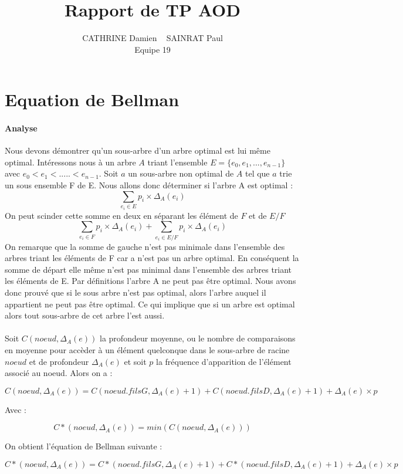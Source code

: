 \documentclass[a4paper, 10pt, french]{article}
\title{ \bf Rapport de TP AOD}
\author{
CATHRINE Damien ~ SAINRAT Paul
\\ Equipe 19
}
\begin{document}
\maketitle

\section{Equation de Bellman}
\paragraph{Analyse} Nous devons démontrer qu'un sous-arbre d'un arbre optimal est lui même optimal. Intéressons nous à un arbre $A$ triant l'ensemble $E = \{e_0,e_1,...,e_{n-1}\}$ avec $e_0<e_1<.....<e_{n-1}$. Soit $a$ un sous-arbre non optimal de $A$ tel que $a$ trie un sous ensemble F de E. Nous allons donc déterminer si l'arbre A est optimal :
\[\sum_{e_i\in E} p_i \times \Delta_{A}(e_i) \]
On peut scinder cette somme en deux en séparant les élément de $F$ et de $E/F$
\[\sum_{e_i\in F} p_i \times \Delta_{A}(e_i) + \sum_{e_i\in E/F} p_i \times \Delta_{A}(e_i) \]
On remarque que la somme de gauche n'est pas minimale dans l'ensemble des arbres triant les éléments de F car a n'est pas un arbre optimal. En conséquent la somme de départ elle même n'est pas minimal dans l'ensemble des arbres triant les éléments de E. Par définitions l'arbre A ne peut pas être optimal. Nous avons donc prouvé que si le sous arbre n'est pas optimal, alors l'arbre auquel il appartient ne peut pas être optimal. Ce qui implique que si un arbre est optimal alors tout sous-arbre de cet arbre l'est aussi.
\\
\\
Soit $C(noeud, \Delta_{A}(e))$ la profondeur moyenne, ou le nombre de comparaisons en moyenne pour accèder à un élément quelconque dans le sous-arbre de racine $noeud$ et de profondeur $\Delta_{A}(e)$ et soit $p$ la fréquence d'apparition de l'élément associé au noeud. Alors on a :

\[  C(noeud, \Delta_{A}(e)) = C(noeud.filsG, \Delta_{A}(e) + 1) + C(noeud.filsD, \Delta_{A}(e) + 1) + \Delta_{A}(e) \times p \]

Avec :

\[  C*(noeud, \Delta_{A}(e)) = min(C(noeud, \Delta_{A}(e))) \]

On obtient l'équation de Bellman suivante :

\[  C*(noeud, \Delta_{A}(e)) = C*(noeud.filsG, \Delta_{A}(e)+1) + C*(noeud.filsD, \Delta_{A}(e)+1) + \Delta_{A}(e) \times p \]
\end{document}
